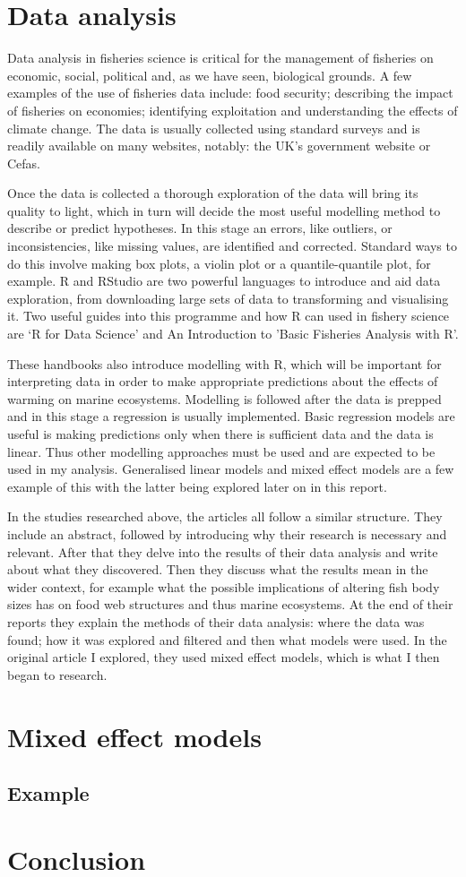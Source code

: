 \documentclass{article}
\begin{document}
\section{Data analysis}

Data analysis in fisheries science is critical for the management of fisheries on economic, social, political and, as we have seen, biological grounds. A few examples of the use of fisheries data include: food security; describing the impact of fisheries on economies; identifying exploitation and understanding the effects of climate change. The data is usually collected using standard surveys and is readily available on many websites, notably: the UK's government website or Cefas.

Once the data is collected a thorough exploration of the data will bring its quality to light, which in turn will decide the most useful modelling method to describe or predict hypotheses. In this stage an errors, like outliers, or inconsistencies, like missing values, are identified and corrected. Standard ways to do this involve making box plots, a violin plot or a quantile-quantile plot, for example. R and RStudio are two powerful languages to introduce and aid data exploration, from downloading large sets of data to transforming and visualising it. Two useful guides into this programme and how R can used in fishery science are ‘R for Data Science’ and An Introduction to 'Basic Fisheries Analysis with R’. 

These handbooks also introduce modelling with R, which will be important for interpreting data in order to make appropriate predictions about the effects of warming on marine ecosystems. Modelling is followed after the data is prepped and in this stage a regression is usually implemented. Basic regression models are useful is making predictions only when there is sufficient data and the data is linear. Thus other modelling approaches must be used and are expected to be used in my analysis. Generalised linear models and mixed effect models are a few example of this with the latter being explored later on in this report.

In the studies researched above, the articles all follow a similar structure. They include an abstract, followed by introducing why their research is necessary and relevant. After that they delve into the results of their data analysis and write about what they discovered. Then they discuss what the results mean in the wider context, for example what the possible implications of altering fish body sizes has on food web structures and thus marine ecosystems. At the end of their reports they explain the methods of their data analysis: where the data was found; how it was explored and filtered and then what models were used. In the original article I explored, they used mixed effect models, which is what I then began to research. 

\section{Mixed effect models}

\subsection{Example}

\section{Conclusion}



\end{document}
